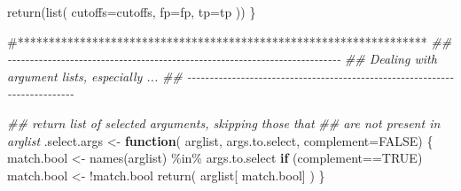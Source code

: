 \documentclass[
  letterpaper,
  DIV=11,
  numbers=noendperiod]{scrartcl}
\newenvironment{Shaded}{\begin{snugshade}}{\end{snugshade}}
\newcommand{\AttributeTok}[1]{\textcolor[rgb]{0.40,0.45,0.13}{#1}}
\newcommand{\CommentTok}[1]{\textcolor[rgb]{0.37,0.37,0.37}{#1}}
\newcommand{\ConstantTok}[1]{\textcolor[rgb]{0.56,0.35,0.01}{#1}}
\newcommand{\ControlFlowTok}[1]{\textcolor[rgb]{0.00,0.23,0.31}{\textbf{#1}}}
\newcommand{\DocumentationTok}[1]{\textcolor[rgb]{0.37,0.37,0.37}{\textit{#1}}}
\newcommand{\FunctionTok}[1]{\textcolor[rgb]{0.28,0.35,0.67}{#1}}
\newcommand{\NormalTok}[1]{\textcolor[rgb]{0.00,0.23,0.31}{#1}}
\newcommand{\OtherTok}[1]{\textcolor[rgb]{0.00,0.23,0.31}{#1}}
\newcommand{\SpecialCharTok}[1]{\textcolor[rgb]{0.37,0.37,0.37}{#1}}
\begin{document}
\begin{Shaded}
\begin{Highlighting}[]
    \FunctionTok{return}\NormalTok{(}\FunctionTok{list}\NormalTok{( }\AttributeTok{cutoffs=}\NormalTok{cutoffs, }\AttributeTok{fp=}\NormalTok{fp, }\AttributeTok{tp=}\NormalTok{tp ))}
\NormalTok{\}}

\CommentTok{\#******************************************************************}
\DocumentationTok{\#\# {-}{-}{-}{-}{-}{-}{-}{-}{-}{-}{-}{-}{-}{-}{-}{-}{-}{-}{-}{-}{-}{-}{-}{-}{-}{-}{-}{-}{-}{-}{-}{-}{-}{-}{-}{-}{-}{-}{-}{-}{-}{-}{-}{-}{-}{-}{-}{-}{-}{-}{-}{-}{-}{-}{-}{-}{-}{-}{-}{-}{-}{-}{-}{-}{-}{-}{-}{-}{-}{-}{-}{-}{-}{-}{-}}
\DocumentationTok{\#\# Dealing with argument lists, especially \textquotesingle{}...\textquotesingle{}}
\DocumentationTok{\#\# {-}{-}{-}{-}{-}{-}{-}{-}{-}{-}{-}{-}{-}{-}{-}{-}{-}{-}{-}{-}{-}{-}{-}{-}{-}{-}{-}{-}{-}{-}{-}{-}{-}{-}{-}{-}{-}{-}{-}{-}{-}{-}{-}{-}{-}{-}{-}{-}{-}{-}{-}{-}{-}{-}{-}{-}{-}{-}{-}{-}{-}{-}{-}{-}{-}{-}{-}{-}{-}{-}{-}{-}{-}{-}{-}}

\DocumentationTok{\#\# return list of selected arguments, skipping those that}
\DocumentationTok{\#\# are not present in arglist}
\NormalTok{.select.args }\OtherTok{\textless{}{-}} \ControlFlowTok{function}\NormalTok{( arglist, args.to.select, }\AttributeTok{complement=}\ConstantTok{FALSE}\NormalTok{) \{}
\NormalTok{    match.bool }\OtherTok{\textless{}{-}} \FunctionTok{names}\NormalTok{(arglist) }\SpecialCharTok{\%in\%}\NormalTok{ args.to.select}
    \ControlFlowTok{if}\NormalTok{ (complement}\SpecialCharTok{==}\ConstantTok{TRUE}\NormalTok{) match.bool }\OtherTok{\textless{}{-}} \SpecialCharTok{!}\NormalTok{match.bool}
    \FunctionTok{return}\NormalTok{( arglist[ match.bool] )}
\NormalTok{\}}


\end{Highlighting}
\end{Shaded}
\end{document}
